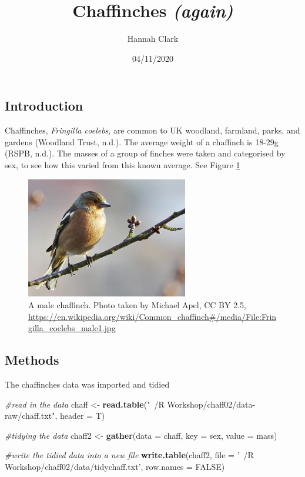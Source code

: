 \documentclass[
]{article}
\title{Chaffinches \emph{(again)}}
\author{Hannah Clark}
\date{04/11/2020}
\newenvironment{Shaded}{\begin{snugshade}}{\end{snugshade}}
\newcommand{\CommentTok}[1]{\textcolor[rgb]{0.56,0.35,0.01}{\textit{#1}}}
\newcommand{\DataTypeTok}[1]{\textcolor[rgb]{0.13,0.29,0.53}{#1}}
\newcommand{\KeywordTok}[1]{\textcolor[rgb]{0.13,0.29,0.53}{\textbf{#1}}}
\newcommand{\NormalTok}[1]{#1}
\newcommand{\OtherTok}[1]{\textcolor[rgb]{0.56,0.35,0.01}{#1}}
\newcommand{\StringTok}[1]{\textcolor[rgb]{0.31,0.60,0.02}{#1}}
\begin{document}
\maketitle

{
\setcounter{tocdepth}{2}
\tableofcontents
}
\hypertarget{introduction}{%
\subsection{Introduction}\label{introduction}}

Chaffinches, \emph{Fringilla coelebs}, are common to UK woodland, farmland, parks, and gardens (Woodland Trust, n.d.). The average weight of a chaffinch is 18-29g (RSPB, n.d.). The masses of a group of finches were taken and categorised by sex, to see how this varied from this known average. See Figure \ref{fig:malechaff-fig}



\begin{figure}
\includegraphics[height=200px]{figures/malechaff01} \caption{A male chaffinch. Photo taken by Michael Apel, CC BY 2.5, \url{https://en.wikipedia.org/wiki/Common_chaffinch\#/media/File:Fringilla_coelebs_male1.jpg}}\label{fig:malechaff-fig}
\end{figure}

\hypertarget{methods}{%
\subsection{Methods}\label{methods}}

The chaffinches data was imported and tidied

\begin{Shaded}
\begin{Highlighting}[]
\CommentTok{#read in the data}
\NormalTok{chaff <-}\StringTok{ }\KeywordTok{read.table}\NormalTok{(}\StringTok{"~/R Workshop/chaff02/data-raw/chaff.txt"}\NormalTok{, }\DataTypeTok{header =}\NormalTok{ T)}

\CommentTok{#tidying the data}
\NormalTok{chaff2 <-}\StringTok{ }\KeywordTok{gather}\NormalTok{(}\DataTypeTok{data =}\NormalTok{ chaff, }\DataTypeTok{key =}\NormalTok{ sex, }\DataTypeTok{value =}\NormalTok{ mass)}

\CommentTok{#write the tidied data into a new file}
\KeywordTok{write.table}\NormalTok{(chaff2, }\DataTypeTok{file =} \StringTok{'~/R Workshop/chaff02/data/tidychaff.txt'}\NormalTok{, }\DataTypeTok{row.names =} \OtherTok{FALSE}\NormalTok{)}
\end{Highlighting}
\end{Shaded}
\end{document}
